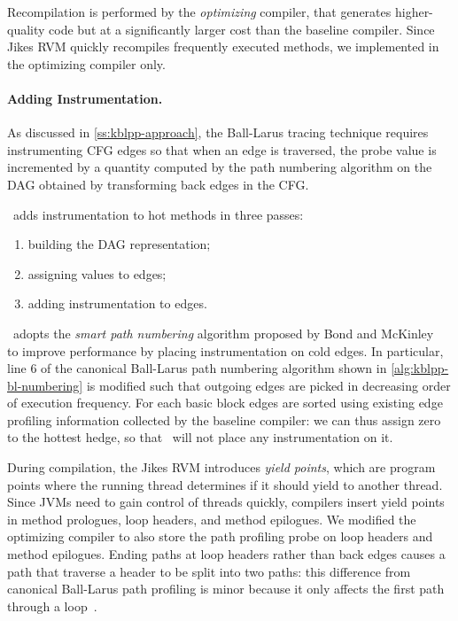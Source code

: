 Recompilation is performed by the {\em optimizing} compiler, that generates higher-quality code but at a significantly larger cost than the baseline compiler. Since Jikes RVM quickly recompiles frequently executed methods, we implemented \kblpp in the optimizing compiler only.

\paragraph*{Adding Instrumentation.} As discussed in \mysection\ref{ss:kblpp-approach}, the Ball-Larus tracing technique requires instrumenting CFG edges so that when an edge is traversed, the probe value is incremented by a quantity computed by the path numbering algorithm on the DAG obtained by transforming back edges in the CFG.

\kblpp\ adds instrumentation to hot methods in three passes:
\begin{enumerate}[itemsep=0pt]
 \item building the DAG representation;
 \item assigning values to edges;
 \item adding instrumentation to edges.
\end{enumerate}

\noindent \kblpp\ adopts the {\em smart path numbering} algorithm proposed by Bond and McKinley~\cite{Bond05b} to improve performance by placing instrumentation on cold edges. In particular, line 6 of the canonical Ball-Larus path numbering algorithm shown in \myalgorithm\ref{alg:kblpp-bl-numbering}  is modified such that outgoing edges are picked in decreasing order of execution frequency. For each basic block edges are sorted using existing edge profiling information collected by the baseline compiler: we can thus assign zero to the hottest hedge, so that \kblpp\ will not place any instrumentation on it.

During compilation, the Jikes RVM introduces {\em yield points}, which are program points where the running thread determines if it should yield to another thread. Since JVMs need to gain control of threads quickly, compilers insert yield points in method prologues, loop headers, and method epilogues. We modified the optimizing compiler to also store the path profiling probe on loop headers and method epilogues. Ending paths at loop headers rather than back edges causes a path that traverse a header to be split into two paths: this difference from canonical Ball-Larus path profiling is minor because it only affects the first path through a loop~\cite{Bond05}.

